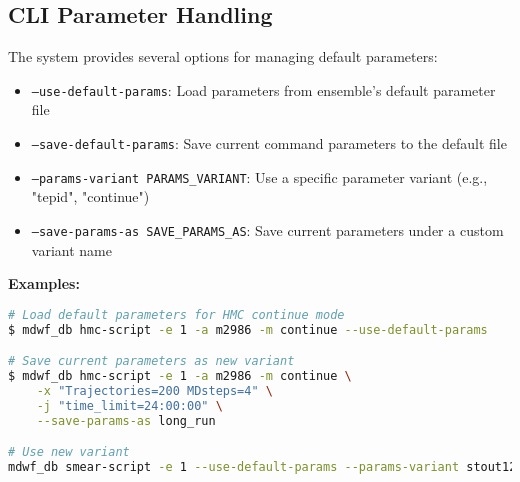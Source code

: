\documentclass{article}
\begin{document}
\subsection{CLI Parameter Handling}

The system provides several options for managing default parameters:

\begin{itemize}
\item \texttt{--use-default-params}: Load parameters from ensemble's default parameter file
\item \texttt{--save-default-params}: Save current command parameters to the default file
\item \texttt{--params-variant PARAMS\_VARIANT}: Use a specific parameter variant (e.g., "tepid", "continue")
\item \texttt{--save-params-as SAVE\_PARAMS\_AS}: Save current parameters under a custom variant name
\end{itemize}

\textbf{Examples:}

\begin{lstlisting}[language=bash]
# Load default parameters for HMC continue mode
$ mdwf_db hmc-script -e 1 -a m2986 -m continue --use-default-params

# Save current parameters as new variant
$ mdwf_db hmc-script -e 1 -a m2986 -m continue \
    -x "Trajectories=200 MDsteps=4" \
    -j "time_limit=24:00:00" \
    --save-params-as long_run

# Use new variant
mdwf_db smear-script -e 1 --use-default-params --params-variant stout12
\end{lstlisting}
\end{document}
